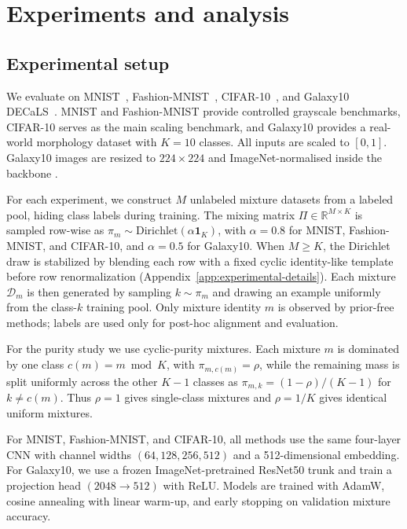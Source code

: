 \documentclass{article}
\theoremstyle{plain}
\theoremstyle{definition}
\theoremstyle{remark}
\begin{document}
\section{Experiments and analysis}

\subsection{Experimental setup}
\label{sec:experimental-setup}

We evaluate on MNIST~\citep{LeCun2005TheMD}, Fashion-MNIST~\citep{Xiao2017FashionMNISTAN}, CIFAR-10~\citep{krizhevsky2010cifar}, and Galaxy10 DECaLS~\citep{Lintott2008GalaxyZM, galaxyCALS}.
MNIST and Fashion-MNIST provide controlled grayscale benchmarks, CIFAR-10 serves as the main scaling benchmark, and Galaxy10 provides a real-world morphology dataset with $K=10$ classes.
All inputs are scaled to $[0,1]$. Galaxy10 images are resized to $224\times224$ and ImageNet-normalised inside the backbone \cite{Imagenet2009}.

For each experiment, we construct $M$ unlabeled mixture datasets from a labeled pool, hiding class labels during training. The mixing matrix $\Pi \in \mathbb{R}^{M\times K}$ is sampled row-wise as $\pi_m \sim \mathrm{Dirichlet}(\alpha \mathbf{1}_K)$, with $\alpha=0.8$ for MNIST, Fashion-MNIST, and CIFAR-10, and $\alpha=0.5$ for Galaxy10. When $M \ge K$, the Dirichlet draw is stabilized by blending each row with a fixed cyclic identity-like template before row renormalization (Appendix~\ref{app:experimental-details}). Each mixture $\mathcal{D}_m$ is then generated by sampling $k \sim \pi_m$ and drawing an example uniformly from the class-$k$ training pool. Only mixture identity $m$ is observed by prior-free methods; labels are used only for post-hoc alignment and evaluation.

For the purity study we use cyclic-purity mixtures. Each mixture $m$ is dominated by one class $c(m)=m \bmod K$, with $\pi_{m,c(m)}=\rho$, while the remaining mass is split uniformly across the other $K-1$ classes as $\pi_{m,k} = (1-\rho)/(K-1)$ for $k \neq c(m)$. Thus $\rho=1$ gives single-class mixtures and $\rho=1/K$ gives identical uniform mixtures.

For MNIST, Fashion-MNIST, and CIFAR-10, all methods use the same four-layer CNN with channel widths $(64,128,256,512)$ and a 512-dimensional embedding.
For Galaxy10, we use a frozen ImageNet-pretrained ResNet50 \cite{He2015DeepRL} trunk and train a projection head $(2048\to512)$ with ReLU.
Models are trained with AdamW, cosine annealing with linear warm-up, and early stopping on validation mixture accuracy.
\end{document}
